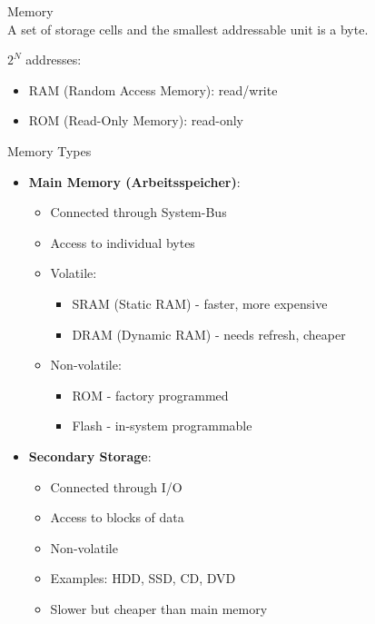 \begin{corollary}{Memory} \\
A set of storage cells and the smallest addressable unit is a byte.

$2^N$ addresses:
\begin{itemize}
  \item RAM (Random Access Memory): read/write
  \item ROM (Read-Only Memory): read-only
\end{itemize}
\end{corollary}

\raggedcolumns




\begin{corollary}{Memory Types}
\begin{itemize}
  \item \textbf{Main Memory (Arbeitsspeicher)}:
    \begin{itemize}
      \item Connected through System-Bus
      \item Access to individual bytes
      \item Volatile: 
        \begin{itemize}
          \item SRAM (Static RAM) - faster, more expensive
          \item DRAM (Dynamic RAM) - needs refresh, cheaper
        \end{itemize}
      \item Non-volatile: 
        \begin{itemize}
          \item ROM - factory programmed
          \item Flash - in-system programmable
        \end{itemize}
    \end{itemize}
  \item \textbf{Secondary Storage}:
    \begin{itemize}
      \item Connected through I/O
      \item Access to blocks of data
      \item Non-volatile
      \item Examples: HDD, SSD, CD, DVD
      \item Slower but cheaper than main memory
    \end{itemize}
\end{itemize}
\end{corollary}

